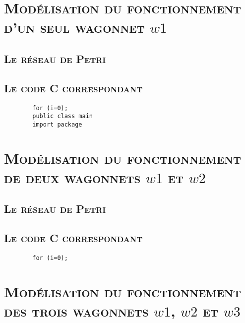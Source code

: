 \chapter{\textsc{ Modélisation du fonctionnement d'un seul wagonnet $w1$ }}
\section{\textsc{Le réseau de Petri}}
	
	\begin{center}
	\label{fig1} 
	\end{center}  

\section{\textsc{Le code C correspondant}}
	\begin{lstlisting}
		for (i=0);
		public class main 
		import package
	\end{lstlisting}

	
\chapter{\textsc{ Modélisation du fonctionnement de deux wagonnets $w1$ et $w2$ }}
\section{\textsc{Le réseau de Petri}}
	
	\begin{center}
	\label{fig2} 
	\end{center}  

\section{\textsc{Le code C correspondant}}
	\begin{lstlisting}
		for (i=0);
	\end{lstlisting}



\chapter{\textsc{ Modélisation du fonctionnement des trois wagonnets $w1$, $w2$ et $w3$}}
